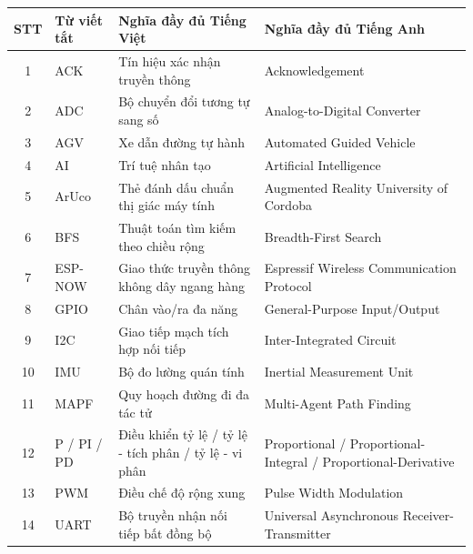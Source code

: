 \documentclass[12pt,a4paper]{report}
\newcommand{\tablefont}{\fontsize{12pt}{15pt}\selectfont}
\begin{document}
	\begin{table}[h!]
		\centering
		\tablefont
		\renewcommand{\arraystretch}{1.25}
		\begin{tabular}{|c|p{2.4cm}|p{5.6cm}|p{4.6cm}|}
			\hline
			\textbf{STT} & \textbf{Từ viết tắt} & \textbf{Nghĩa đầy đủ Tiếng Việt} & \textbf{Nghĩa đầy đủ Tiếng Anh} \\
			\hline
			1 & ACK & Tín hiệu xác nhận truyền thông & Acknowledgement \\
			\hline
			2 & ADC & Bộ chuyển đổi tương tự sang số & Analog-to-Digital Converter \\
			\hline
			3 & AGV & Xe dẫn đường tự hành & Automated Guided Vehicle \\
			\hline
			4 & AI & Trí tuệ nhân tạo & Artificial Intelligence \\
			\hline
			5 & ArUco & Thẻ đánh dấu chuẩn thị giác máy tính & Augmented Reality University of Cordoba \\
			\hline
			6 & BFS & Thuật toán tìm kiếm theo chiều rộng & Breadth-First Search \\
			\hline
			7 & ESP-NOW & Giao thức truyền thông không dây ngang hàng & Espressif Wireless Communication Protocol \\
			\hline
			8 & GPIO & Chân vào/ra đa năng & General-Purpose Input/Output \\
			\hline
			9 & I2C & Giao tiếp mạch tích hợp nối tiếp & Inter-Integrated Circuit \\
			\hline
			10 & IMU & Bộ đo lường quán tính & Inertial Measurement Unit \\
			\hline
			11 & MAPF & Quy hoạch đường đi đa tác tử & Multi-Agent Path Finding \\
			\hline
			12 & P / PI / PD & Điều khiển tỷ lệ / tỷ lệ - tích phân / tỷ lệ - vi phân & Proportional / Proportional-Integral / Proportional-Derivative \\
			\hline
			13 & PWM & Điều chế độ rộng xung & Pulse Width Modulation \\
			\hline
			14 & UART & Bộ truyền nhận nối tiếp bất đồng bộ & Universal Asynchronous Receiver-Transmitter \\
			\hline
		\end{tabular}
	\end{table}
	
	\newpage
	\listoftables
	
\end{document}

